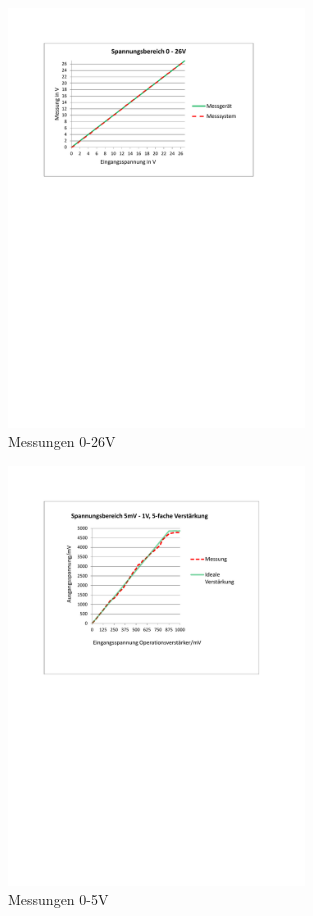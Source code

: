 \documentclass[
	11pt,								%
	a4paper,						%
	oneside,						%
	titlepage,					%
	headsepline,				%
	DIV13,							%
	abstracton,	 				%
	BCOR0cm,						%
	bibliography=totoc, %
]{scrreprt}							%
\begin{document}
\begin{figure}[htb]
\centering
\includegraphics[width=0.7\textwidth]{images/26Vpdf.pdf}
\caption{Messungen 0-26V}
\label{fig:26v}
\end{figure}

\begin{figure}[htb]
\centering
\includegraphics[width=0.7\textwidth]{images/mVpdf.pdf}
\caption{Messungen 0-5V}
\label{fig:mv}
\end{figure}
\end{document}
